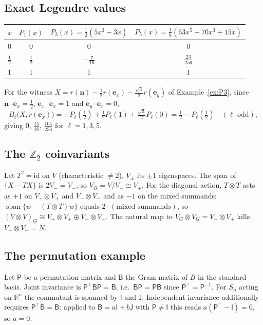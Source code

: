 \documentclass[11pt,a4paper]{article}
\newcommand{\RR}{\mathbb{R}}
\newcommand{\spn}{\operatorname{span}}
\newcommand{\id}{\mathrm{id}}
\theoremstyle{plain}
\theoremstyle{definition}
\begin{document}
\subsection{Exact Legendre values}
\begin{center}\small
\begin{tabular}{@{}lccc@{}}
\toprule
$x$ & $P_1(x)$ & $P_3(x)=\tfrac12(5x^3-3x)$ & $P_5(x)=\tfrac18(63x^5-70x^3+15x)$\\
\midrule
$0$ & $0$ & $0$ & $0$\\
$\tfrac12$ & $\tfrac12$ & $-\tfrac7{16}$ & $\tfrac{23}{256}$\\
$1$ & $1$ & $1$ & $1$\\
\bottomrule
\end{tabular}
\end{center}
For the witness $X=r(\mathbf n)-\tfrac12r(\mathbf e_x)-\tfrac{\sqrt3}2r(\mathbf e_y)$ of Example~\ref{ex:P3}, since $\mathbf n\cdot\mathbf e_x=\tfrac12$, $\mathbf e_x\cdot\mathbf e_x=1$ and $\mathbf e_y\cdot\mathbf e_x=0$,
\[ B_\ell\bigl(X,r(\mathbf e_x)\bigr)=-P_\ell(\tfrac12)+\tfrac12P_\ell(1)+\tfrac{\sqrt3}2P_\ell(0)=\tfrac12-P_\ell(\tfrac12)\quad(\ell\text{ odd}), \]
giving $0$, $\tfrac{15}{16}$, $\tfrac{105}{256}$ for $\ell=1,3,5$.

\subsection{The \texorpdfstring{$\mathbb Z_2$}{Z2} coinvariants}
Let $T^2=\id$ on $V$ (characteristic $\neq2$), $V_\pm$ its $\pm1$ eigenspaces. The span of $\{X-TX\}$ is $2V_-\!=V_-$, so $V_G=V/V_-\cong V_+$. For the diagonal action, $T\otimes T$ acts as $+1$ on $V_+\!\otimes V_+$ and $V_-\!\otimes V_-$ and as $-1$ on the mixed summands; $\spn\{w-(T\otimes T)w\}$ equals $2\cdot(\text{mixed summands})$, so $(V\otimes V)_G\cong V_+\!\otimes V_+\oplus V_-\!\otimes V_-$. The natural map to $V_G\otimes V_G=V_+\otimes V_+$ kills $V_-\otimes V_-=N$.

\subsection{The permutation example}
Let $\mathsf P$ be a permutation matrix and $\mathsf B$ the Gram matrix of $B$ in the standard basis. Joint invariance is $\mathsf P^{\!\top}\mathsf B\mathsf P=\mathsf B$, i.e.\ $\mathsf B\mathsf P=\mathsf P\mathsf B$ since $\mathsf P^{\!\top}=\mathsf P^{-1}$. For $S_n$ acting on $\RR^n$ the commutant is spanned by $\mathsf I$ and $\mathsf J$. Independent invariance additionally requires $\mathsf P^{\!\top}\mathsf B=\mathsf B$: applied to $\mathsf B=a\mathsf I+b\mathsf J$ with $\mathsf P\ne\mathsf I$ this reads $a(\mathsf P^{\!\top}-\mathsf I)=0$, so $a=0$.
\end{document}

